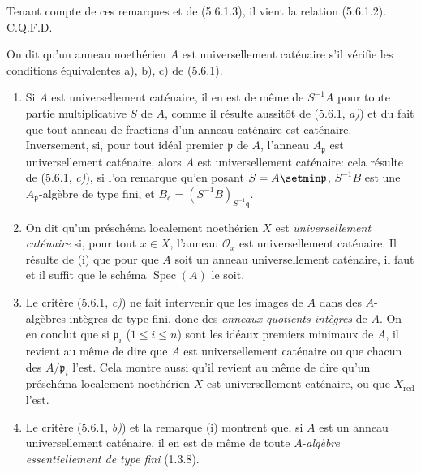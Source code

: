 Tenant compte de ces remarques et de (5.6.1.3), il vient la relation
(5.6.1.2). C.Q.F.D.

\begin{definition}[5.6.2]
\label{IV.2.s5.6.2-fr}
On dit qu'un anneau noethérien $A$ est universellement caténaire s'il
vérifie les conditions équivalentes \textup{a), b), c)} de \textup{(5.6.1)}.
\end{definition}

\begin{remarks}[5.6.3]
\label{IV.2.s5.6.3-fr}
\begin{enumerate}
\item[(i)] Si $A$ est universellement caténaire, il en est de même de
$S^{-1}A$ pour toute partie multiplicative $S$ de $A$, comme il résulte
aussitôt de (5.6.1, \emph{a)}) et du fait que tout anneau de fractions d'un anneau
caténaire est caténaire. Inversement, si, pour tout idéal premier
$\mathfrak p$ de $A$, l'anneau $A_{\mathfrak p}$ est universellement
caténaire, alors $A$ est universellement caténaire: cela résulte de
(5.6.1, \emph{c)}), si l'on remarque qu'en posant $S=A\setmin\mathfrak p$, $S^{-1}B$
est une $A_{\mathfrak p}$-algèbre de type fini, et
$B_{\mathfrak q}=(S^{-1}B)_{S^{-1}\mathfrak q}$.
\item[(ii)] On dit qu'un préschéma localement noethérien $X$ est
\emph{universellement caténaire} si, pour tout $x\in X$, l'anneau
$\mathcal O_x$ est universellement caténaire. Il résulte de (i) que pour que
$A$ soit un anneau universellement caténaire, il faut et il suffit que le
schéma $\operatorname{Spec}(A)$ le soit.
\item[(iii)] Le critère (5.6.1, \emph{c)}) ne fait intervenir que les images de $A$
dans des $A$-algèbres intègres de type fini, donc des \emph{anneaux quotients
intègres} de $A$. On en conclut que si
$\mathfrak p_i$ ($1\leq i\leq n$) sont les idéaux premiers minimaux de $A$,
il revient au même de dire que $A$ est universellement caténaire ou que
chacun des $A/\mathfrak p_i$ l'est. Cela montre aussi qu'il revient au même
de dire qu'un préschéma localement noethérien $X$ est universellement
caténaire, ou que $X_{\mathrm{red}}$ l'est.
\item[(iv)] Le critère (5.6.1, \emph{b)}) et la remarque (i) montrent que, si $A$
est un anneau universellement caténaire, il en est de même de toute
$A$-\emph{algèbre essentiellement de type fini} (1.3.8).
\end{enumerate}
\end{remarks}

